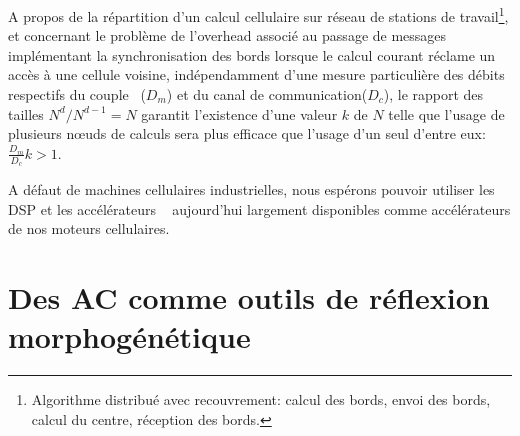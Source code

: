 A propos de la r\'epartition d'un calcul cellulaire sur r\'eseau de
stations de travail\footnote{%
  Algorithme distribu\'e avec recouvrement: calcul des bords, envoi des
  bords, calcul du centre, r\'eception des bords.}, %
et concernant le probl\`eme de l'overhead associ\'e au passage de messages
impl\'ementant la synchronisation des bords lorsque le calcul courant
r\'eclame un acc\`es \`a une cellule voisine, ind\'ependamment d'une mesure
particuli\`ere des d\'ebits respectifs du couple
~($D_{m}$) et du canal de communication($D_{c}$),
le rapport des tailles  $N^{d}/N^{d-1} = N$
garantit l'existence d'une valeur $k$ de $N$ telle que l'usage de
plusieurs n{\oe}uds de calculs sera plus efficace que l'usage d'un
seul d'entre eux:~$\frac{D_{m}}{D_{c}} k > 1$. %

A d\'efaut de machines cellulaires industrielles, nous
esp\'erons pouvoir utiliser les DSP et les acc\'el\'erateurs
~\cite[]{Pike84} aujourd'hui largement disponibles
comme acc\'el\'erateurs de nos moteurs cellulaires. %

\section[AC et morphog\'en\`ese]{Des AC comme outils de r\'eflexion morphog\'en\'etique}

